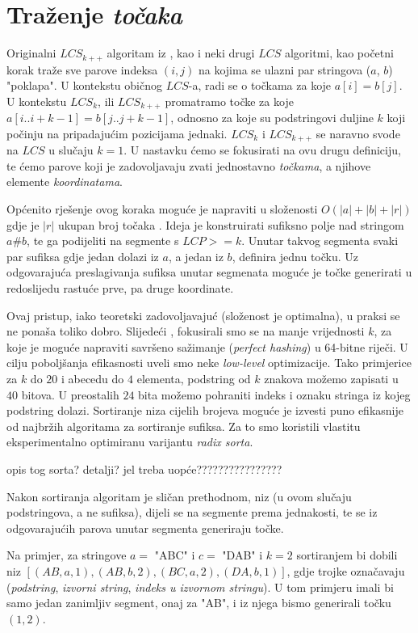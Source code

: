 \documentclass[times, utf8, seminar, numeric]{fer}
\begin{document}
\section{Traženje \emph{točaka}}
Originalni $LCS_{k++}$ algoritam iz \cite{Pavetic}, kao  i neki
drugi $LCS$ algoritmi, kao početni korak traže sve parove indeksa $(i,
j)$ na kojima se ulazni par stringova ($a$, $b$) "poklapa". U
kontekstu običnog $LCS$-a, radi se o točkama za koje $a[i] = b[j]$.  U
kontekstu $LCS_k$, ili $LCS_{k++}$ promatramo točke za koje $a[i..i+k-1] =
b[j..j+k-1]$, odnosno za koje su podstringovi duljine $k$ koji počinju
na pripadajućim pozicijama jednaki. $LCS_k$ i $LCS_{k++}$ se naravno svode
na $LCS$ u slučaju $k = 1$. U nastavku ćemo se fokusirati na ovu drugu
definiciju, te ćemo parove koji je zadovoljavaju zvati jednostavno
\emph{točkama}, a njihove elemente \emph{koordinatama}.

Općenito rješenje ovog koraka moguće je napraviti u složenosti
$O(|a| + |b| + |r|)$ gdje je $|r|$ ukupan broj točaka \cite{poljaci}.
Ideja je konstruirati sufiksno polje nad stringom $a\#b$, te ga
podijeliti na segmente s $LCP >= k$. Unutar takvog segmenta svaki
par sufiksa gdje jedan dolazi iz $a$, a jedan iz $b$, definira jednu
točku. Uz odgovarajuća preslagivanja sufiksa unutar segmenata moguće
je točke generirati u redoslijedu rastuće prve, pa druge koordinate.

Ovaj pristup, iako teoretski zadovoljavajuć (složenost je optimalna),
u praksi se ne ponaša toliko dobro. Slijedeći \cite{Pavetic},
fokusirali smo se na manje vrijednosti $k$, za koje
je moguće napraviti savršeno sažimanje (\emph{perfect hashing}) u
64-bitne riječi. U cilju poboljšanja efikasnosti uveli smo neke
\emph{low-level} optimizacije. Tako primjerice za $k$ do $20$ i abecedu
do $4$ elementa, podstring od $k$ znakova možemo zapisati u $40$
bitova.  U preostalih $24$ bita možemo pohraniti indeks i oznaku
stringa iz kojeg podstring dolazi. Sortiranje niza cijelih brojeva
moguće je izvesti puno efikasnije od najbržih algoritama za
sortiranje sufiksa. Za to smo koristili vlastitu eksperimentalno 
optimiranu varijantu \emph{radix sorta}.

{opis tog sorta? detalji? jel treba uopće????????????????}

Nakon sortiranja algoritam je sličan prethodnom, niz (u ovom slučaju
podstringova, a ne sufiksa), dijeli se na segmente prema jednakosti,
te se iz odgovarajućih parova unutar segmenta generiraju točke.

Na primjer, za stringove $a =$ "ABC" i $c =$ "DAB" i $k = 2$
sortiranjem bi dobili niz $[(AB, a, 1), (AB, b, 2), (BC, a, 2), (DA,
  b, 1)]$, gdje trojke označavaju (\emph{podstring}, \emph{izvorni
  string}, \emph{indeks u izvornom stringu}). U tom primjeru imali
bi samo jedan zanimljiv segment, onaj za "AB", i iz njega bismo
generirali točku $(1, 2)$.
\end{document}
